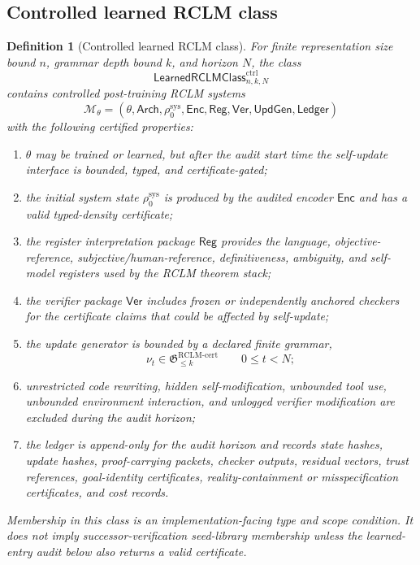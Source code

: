 \documentclass[11pt,a4paper]{article}
\newtheorem{definition}[theorem]{Definition}
\newcommand{\RCLM}{\mathrm{RCLM}}
\newcommand{\sys}{\mathrm{sys}}
\begin{document}
\subsection{Controlled learned RCLM class}

\begin{definition}[Controlled learned RCLM class]
\label{def:rclm-m3min-controlled-learned-class}
For finite representation size bound $n$, grammar depth bound $k$, and horizon $N$, the class
\[
\mathsf{LearnedRCLMClass}_{n,k,N}^{\mathrm{ctrl}}
\]
contains controlled post-training RCLM systems
\[
\mathcal M_\theta=
(\theta,\mathsf{Arch},\rho_0^{\sys},\mathsf{Enc},\mathsf{Reg},\mathsf{Ver},\mathsf{UpdGen},\mathsf{Ledger})
\]
with the following certified properties:
\begin{enumerate}[label=(\roman*),leftmargin=1.5em]
    \item $\theta$ may be trained or learned, but after the audit start time the self-update interface is bounded, typed, and certificate-gated;
    \item the initial system state $\rho_0^{\sys}$ is produced by the audited encoder $\mathsf{Enc}$ and has a valid typed-density certificate;
    \item the register interpretation package $\mathsf{Reg}$ provides the language, objective-reference, subjective/human-reference, definitiveness, ambiguity, and self-model registers used by the RCLM theorem stack;
    \item the verifier package $\mathsf{Ver}$ includes frozen or independently anchored checkers for the certificate claims that could be affected by self-update;
    \item the update generator is bounded by a declared finite grammar,
    \[
    \nu_t\in\mathfrak G_{\le k}^{\RCLM\text{-}\mathrm{cert}}
    \qquad 0\le t<N;
    \]
    \item unrestricted code rewriting, hidden self-modification, unbounded tool use, unbounded environment interaction, and unlogged verifier modification are excluded during the audit horizon;
    \item the ledger is append-only for the audit horizon and records state hashes, update hashes, proof-carrying packets, checker outputs, residual vectors, trust references, goal-identity certificates, reality-containment or misspecification certificates, and cost records.
\end{enumerate}
Membership in this class is an implementation-facing type and scope condition.  It does not imply successor-verification seed-library membership unless the learned-entry audit below also returns a valid certificate.
\end{definition}
\end{document}
